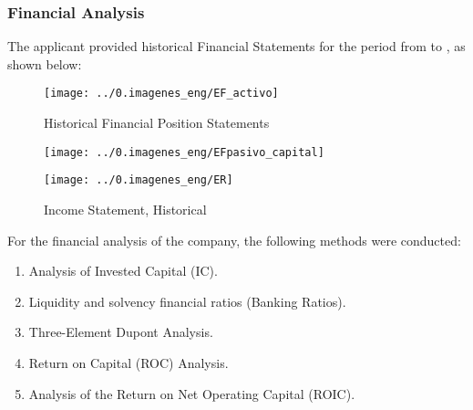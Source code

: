 \subsubsection{Financial Analysis}


The applicant provided historical Financial Statements for the period from \EFde{}  to \EFhasta, as shown below:

\begin{figure}[H]
\centering
\caption{Historical Financial Position Statements  \EFdeHasta \label{fig:ESF}}\vspace{10pt}
\texttt{[image: ../0.imagenes\_eng/EF\_activo]}\\[5pt]

\end{figure}
\begin{figure}[H]
\centering
\texttt{[image: ../0.imagenes\_eng/EFpasivo\_capital]}\\

\end{figure}

\begin{figure}[H]
\centering
\caption{Income Statement, Historical  \EFdeHasta \label{fig:ESF}}\vspace{10pt}
\texttt{[image: ../0.imagenes\_eng/ER]}\\
\end{figure}


For the financial analysis of the company, the following methods were conducted:
\begin{enumerate}
\item Analysis of Invested Capital (IC).
\item Liquidity and solvency financial ratios (Banking Ratios).
\item Three-Element Dupont Analysis.
\item Return on Capital (ROC) Analysis.
\item Analysis of the Return on Net Operating Capital (ROIC).
\end{enumerate}




